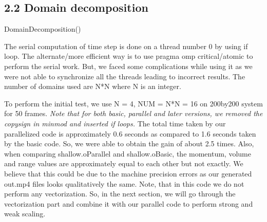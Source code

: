 \documentclass[11pt]{article}
\begin{document}
    \subsection{2.2 Domain decomposition}
        \begin{algorithm}
            \caption{DomainDecomposition()}
            \begin{algorithmic}
                      \ENDFOR
                \ENDWHILE
            \end{algorithmic}
        \end{algorithm}   
        The serial computation of time step is done on a thread number 0 by using if loop. The alternate/more efficient way is to use pragma omp critical/atomic to perform the serial work. But, we faced some complications while using it as we were not able to synchronize all the threads leading to incorrect results. The number of domains used are N*N where N is an integer.  

        To perform the initial test, we use N = 4, NUM = N*N = 16 on 200by200 system for 50 frames. \textit {Note that for both basic, parallel and later versions, we removed the copysign in minmod and inserted if loops.}  The total time taken by our parallelized code is approximately 0.6 seconds as compared to 1.6 seconds taken by the basic code. So, we were able to obtain the gain of about 2.5 times. Also, when comparing shallow.oParallel and shallow.oBasic, the momentum, volume and range values are approximately equal to each other but not exactly. We believe that this could be due to the machine precision errors as our generated out.mp4 files looks qualitatively the same. Note, that in this code we do not perform any vectorization. So, in the next section, we will go through the vectorization part and  combine it with our parallel code to perform strong and weak scaling.
         
\end{document}
